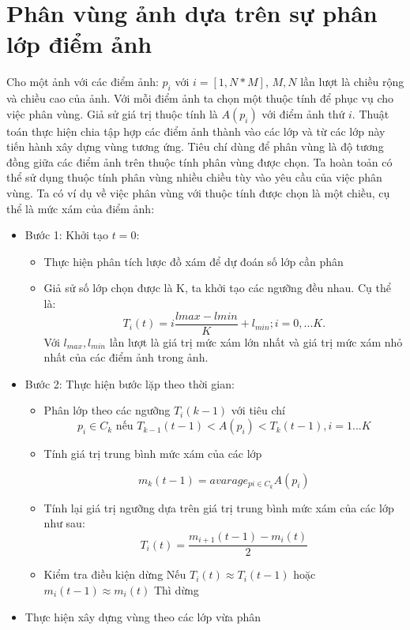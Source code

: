 \documentclass[14pt,oneside,a4paper]{extreport}
\begin{document}
\section{Phân vùng ảnh dựa trên sự phân lớp điểm ảnh}
Cho một ảnh với các điểm ảnh: $p_{i}$ với $i=[1,N*M]$, $M,N$ lần lượt là chiều rộng và chiều cao của ảnh. Với mỗi điểm ảnh ta chọn một thuộc tính để phục vụ cho việc phân vùng. Giả sử giá trị thuộc tính là $A(p_{i})$ với điểm ảnh thứ $i$. Thuật toán thực hiện chia tập hợp các điểm ảnh thành vào các lớp và từ các lớp này tiến hành xây dựng vùng tương ứng. Tiêu chí dùng để phân vùng là độ tương đồng giữa các điểm ảnh trên thuộc tính phân vùng được chọn. Ta hoàn toản có thể sử dụng thuộc tính phân vùng nhiều chiều tùy vào yêu cầu của việc phân vùng.
Ta có ví dụ về việc phân vùng với thuộc tính được chọn là một chiều, cụ thể là mức xám của điểm ảnh:
\begin{itemize}
\item Bước 1:
Khởi tạo $t=0$:
\begin{itemize}
\item Thực hiện phân tích lược đồ xám để dự đoán số lớp cần phân
\item Giả sử số lớp chọn được là K, ta khởi tạo các ngưỡng đều nhau. Cụ thể là:
\begin{equation*}
T_i(t)=i\dfrac{lmax-lmin}{K}+l_{min}; i=0,...K. 
\end{equation*}
Với $l_{max}, l_{min}$ lần lượt là giá trị mức xám lớn nhất và giá trị mức xám nhỏ nhất của các điểm ảnh trong ảnh.
\end{itemize}
\item Bước 2: Thực hiện bước lặp theo thời gian:
\begin{itemize}
\item Phân lớp theo các ngưỡng $T_i(k-1)$ với tiêu chí
\begin{equation*}
p_i\in C_k \textrm{ nếu }T_{k-1}(t-1)<A(p_i)<T_{k}(t-1), i=1...K
\end{equation*}
\item Tính giá trị trung bình mức xám của các lớp 

\begin{equation*}
m_k(t-1)= avarage_{pi\in C_k}A(p_i)
\end{equation*}
\item Tính lại giá trị ngưỡng dựa trên giá trị trung bình mức xám của các lớp như sau:
\begin{equation*}
T_i(t)=\dfrac{m_{i+1}(t-1)-m_{i}(t)}{2}
\end{equation*}
\item Kiểm tra điều kiện dừng
Nếu $T_i(t)\approx T_i(t-1)$ hoặc $m_{i}(t-1)\approx m_{i}(t)$ Thì dừng
\end{itemize}
\item Thực hiện xây dựng vùng theo các lớp vừa phân
\end{itemize}
\end{document}
